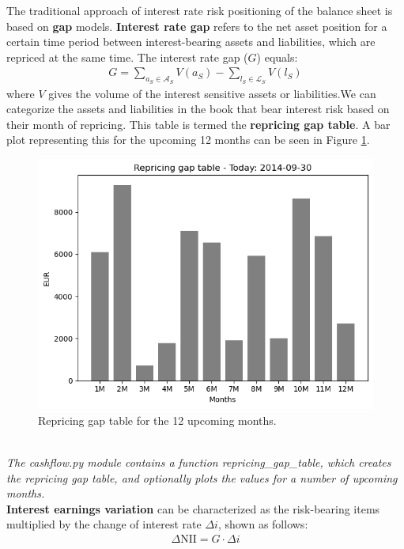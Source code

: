 \documentclass[11pt]{article}
\begin{document}
 The traditional approach of interest rate risk positioning of the balance sheet is based on \textbf{gap} models. \textbf{Interest rate gap} refers to the net asset position for a certain time period between interest-bearing assets and liabilities, which are repriced at the same time. The interest rate gap ($G$) equals:
\begin{align}
	G=\sum_{a_S\in\mathcal{A}_S}V(a_S)-\sum_{l_S\in\mathcal{L}_S}V(l_S)
\end{align}
where $V$ gives the volume of the interest sensitive assets or liabilities.We can categorize the assets and liabilities in the book that bear interest risk based on their month of repricing. This table is termed the \textbf{repricing gap table}. A bar plot representing this for the upcoming 12 months can be seen in Figure \ref{repricing_gap_table}.\begin{figure}[ht!]\label{repricing_gap_table}
	\centering
	\includegraphics[scale=0.4]{images/reprGapTable}	
	\caption{Repricing gap table for the 12 upcoming months.}
\end{figure}\\

\textit{The cashflow.py module contains a function repricing\_gap\_table, which creates the repricing gap table, and optionally plots the values for a number of upcoming months.}
\\

\textbf{Interest earnings variation} can be characterized as the risk-bearing items multiplied by the change of interest rate $\Delta i$, shown as follows:
\begin{align}
	\Delta\text{NII}=G\cdot \Delta i
\end{align}
\end{document}
